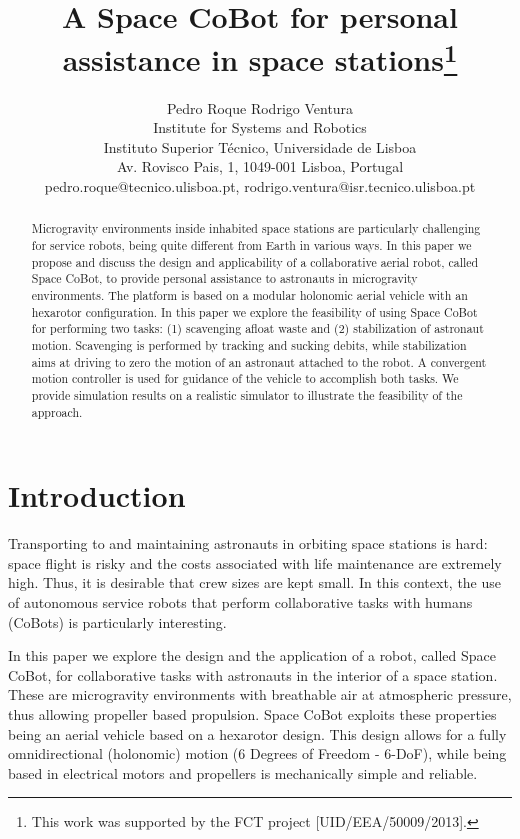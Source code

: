 \documentclass{article}
\title{A Space CoBot for personal assistance in space stations\thanks{This work was
supported by the FCT project [UID/EEA/50009/2013].}}
\author{Pedro Roque \qquad Rodrigo Ventura \\
  Institute for Systems and Robotics \\
  Instituto Superior Técnico, Universidade de Lisboa \\
  Av. Rovisco Pais, 1, 1049-001 Lisboa, Portugal \\
  pedro.roque@tecnico.ulisboa.pt, rodrigo.ventura@isr.tecnico.ulisboa.pt}
\begin{document}
\maketitle

\begin{abstract}
  Microgravity environments inside inhabited space stations are
  particularly challenging for service robots, being quite different
  from Earth in various ways. In this paper we propose
  and discuss the design and applicability of a collaborative aerial
  robot, called Space CoBot, to provide personal assistance to
  astronauts in microgravity environments. The platform is based on a
  modular holonomic aerial vehicle with an hexarotor configuration. In
  this paper we explore the feasibility of using Space CoBot for
  performing two tasks: (1) scavenging afloat waste and
  (2) stabilization of astronaut motion.  Scavenging is performed by
  tracking and sucking debits, while stabilization aims at
  driving to zero the motion of an astronaut attached to the robot. A
  convergent motion controller is used for guidance of the vehicle to
  accomplish both tasks. We provide simulation results on a realistic
  simulator to illustrate the feasibility of the approach.
\end{abstract}


\section{Introduction}
\label{sec:introduction}

Transporting to and maintaining astronauts in orbiting space stations is
hard: space flight is risky and the costs associated with life
maintenance are extremely high. Thus, it is desirable that crew sizes
are kept small. In this context, the use of
autonomous service robots that perform collaborative tasks with humans
(CoBots) is particularly interesting.

In this paper we explore the design and the application of a robot, called
Space CoBot, for collaborative tasks with astronauts in the interior
of a space station. These are microgravity environments with
breathable air at atmospheric pressure, thus allowing propeller based
propulsion. Space CoBot exploits these properties being an aerial
vehicle based on a hexarotor design. This design allows for a fully
omnidirectional (holonomic) motion (6 Degrees of Freedom - 6-DoF),
while being based in electrical motors and propellers is mechanically
simple and reliable.
\end{document}
